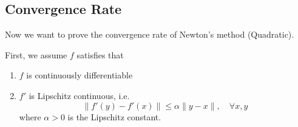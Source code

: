 
\subsection{Convergence Rate}

Now we want to prove the convergence rate of Newton's method (Quadratic).

First, we assume $f$ satisfies that \begin{enumerate}
    \item $f$ is continuously differentiable
    \item $f'$ is Lipschitz continuous, i.e. \[
        \|f'(y) - f'(x)\| \leq \alpha \|y-x\|, \quad \forall x,y    
    \]
    where $\alpha > 0$ is the Lipschitz constant.
\end{enumerate}

